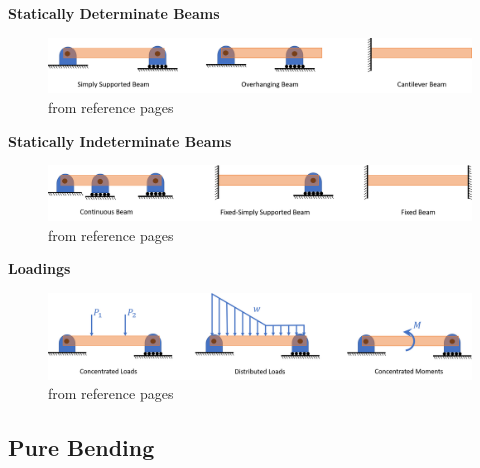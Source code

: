 \textbf{Statically Determinate Beams}
\begin{figure}[!h]
\centering
\includegraphics[angle=0, width=6in]{Bending-Figures/determinateBeams.png}
\vspace{-2mm}
\caption{\small from reference pages}
\vspace{-3mm}
\label{Fig:StaticallyDeterminate}
\end{figure}


\noindent \textbf{Statically Indeterminate Beams}
\begin{figure}[!h]
\centering
\includegraphics[angle=0, width=6in]{Bending-Figures/indeterminateBeams.png}
\vspace{-2mm}
\caption{\small from reference pages}
\vspace{-3mm}
\label{Fig:StaticallyIndeterminate}
\end{figure}

\noindent \textbf{Loadings}
\begin{figure}[!h]
\centering
\includegraphics[angle=0, width=6in]{Bending-Figures/loadings1.png}
\vspace{-2mm}
\caption{\small from reference pages}
\vspace{-3mm}
\label{Fig:Loadings}
\end{figure}


\subsection{}

\subsection{Pure Bending}

